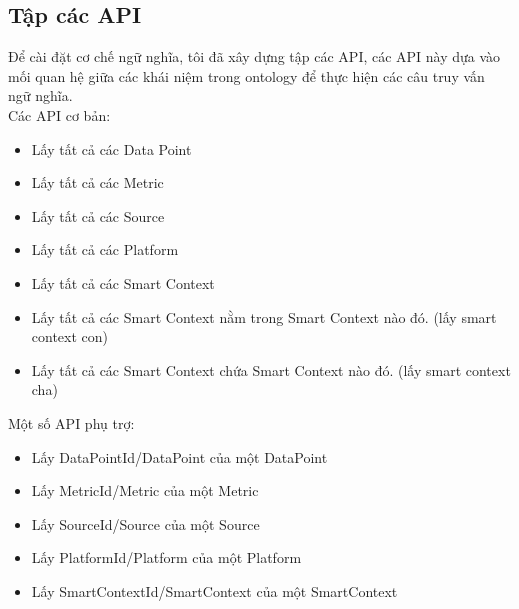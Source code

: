 \subsection{Tập các API}
Để cài đặt cơ chế ngữ nghĩa, tôi đã xây dựng tập các API, các API này dựa vào mối quan hệ giữa các khái niệm trong ontology để thực hiện các câu truy vấn ngữ nghĩa. \\

Các API cơ bản:

\begin{itemize}
	\item Lấy tất cả các Data Point
	\item Lấy tất cả các Metric
	\item Lấy tất cả các Source
	\item Lấy tất cả các Platform
	\item Lấy tất cả các Smart Context
	\item Lấy tất cả các Smart Context nằm trong Smart Context nào đó. (lấy smart context con)
	\item Lấy tất cả các Smart Context chứa Smart Context nào đó. (lấy smart context cha)
\end{itemize}

Một số API phụ trợ:
\begin{itemize}
	\item Lấy DataPointId/DataPoint của một DataPoint
	\item Lấy MetricId/Metric của một Metric
	\item Lấy SourceId/Source của một Source
	\item Lấy PlatformId/Platform của một Platform
	\item Lấy SmartContextId/SmartContext của một SmartContext
\end{itemize}


